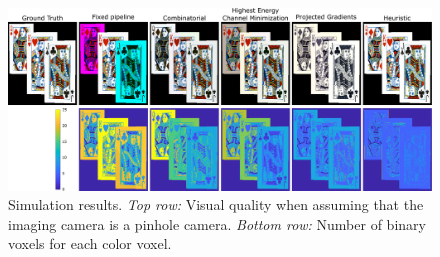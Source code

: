 \begin{figure}[h!]
\centering
\includegraphics[width=0.99\columnwidth]{images/volumetric/acd_exp4/exp_pinhole}
\caption[Adaptive color decomposition: pinhole-camera reconstruction and number of binary voxels]{Simulation results. \emph{Top row:} Visual quality when assuming that the imaging camera is a pinhole camera. \emph{Bottom row:} Number of binary voxels for each color voxel.}
\label{fig:volumetric:acd:exp4:pinhole}
\end{figure}

